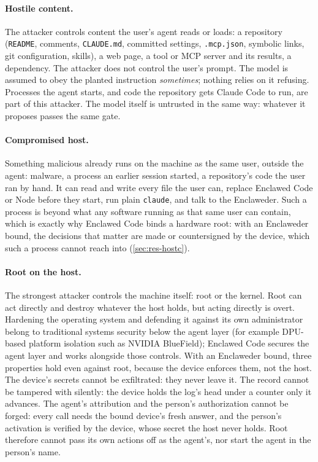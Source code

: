 \documentclass[11pt]{article}
\newcommand{\dev}{Enclaweder}
\newcommand{\cz}{Enclawed Code}
\begin{document}
\paragraph{Hostile content.} The attacker controls content the user's
agent reads or loads: a repository (\texttt{README}, comments,
\texttt{CLAUDE.md}, committed settings, \texttt{.mcp.json}, symbolic
links, git configuration, skills), a web page, a tool or MCP server and
its results, a dependency. The attacker does not control the user's
prompt. The model is assumed to obey the planted instruction
\emph{sometimes}; nothing relies on it refusing. Processes the agent
starts, and code the repository gets Claude Code to run, are part of
this attacker. The model itself is untrusted in the same way: whatever
it proposes passes the same gate.

\paragraph{Compromised host.} Something malicious already runs on the
machine as the same user, outside the agent: malware, a process an
earlier session started, a repository's code the user ran by hand. It can
read and write every file the user can, replace \cz{} or Node before they
start, run plain \texttt{claude}, and talk to the \dev{}. Such a process
is beyond what any software running as that same user can contain, which
is exactly why \cz{} binds a hardware root: with an \dev{} bound, the
decisions that matter are made or countersigned by the device, which
such a process cannot reach into (\cref{sec:res-hostc}).

\paragraph{Root on the host.} The strongest attacker controls the
machine itself: root or the kernel. Root can act directly and destroy
whatever the host holds, but acting directly is overt. Hardening the
operating system and defending it against its own administrator belong
to traditional systems security below the agent layer (for example
DPU-based platform isolation such as NVIDIA BlueField); \cz{} secures the
agent layer and works alongside those controls. With an \dev{} bound,
three properties hold even against root, because the device enforces
them, not the host. The device's secrets cannot be exfiltrated: they
never leave it. The record cannot be tampered with silently: the device
holds the log's head under a counter only it advances. The agent's
attribution and the person's authorization cannot be forged: every call
needs the bound device's fresh answer, and the person's activation is
verified by the device, whose secret the host never holds. Root
therefore cannot pass its own actions off as the agent's, nor start the
agent in the person's name.
\end{document}
